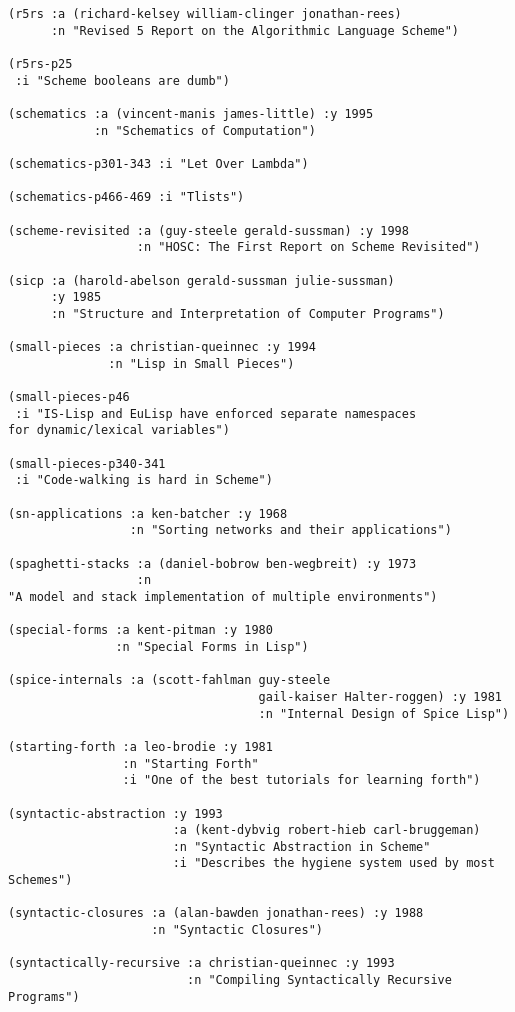 \begin{verbatim}
(r5rs :a (richard-kelsey william-clinger jonathan-rees)
      :n "Revised 5 Report on the Algorithmic Language Scheme")

(r5rs-p25
 :i "Scheme booleans are dumb")

(schematics :a (vincent-manis james-little) :y 1995
            :n "Schematics of Computation")

(schematics-p301-343 :i "Let Over Lambda")

(schematics-p466-469 :i "Tlists")

(scheme-revisited :a (guy-steele gerald-sussman) :y 1998
                  :n "HOSC: The First Report on Scheme Revisited")

(sicp :a (harold-abelson gerald-sussman julie-sussman)
      :y 1985
      :n "Structure and Interpretation of Computer Programs")

(small-pieces :a christian-queinnec :y 1994
              :n "Lisp in Small Pieces")

(small-pieces-p46
 :i "IS-Lisp and EuLisp have enforced separate namespaces
for dynamic/lexical variables")

(small-pieces-p340-341
 :i "Code-walking is hard in Scheme")

(sn-applications :a ken-batcher :y 1968
                 :n "Sorting networks and their applications")

(spaghetti-stacks :a (daniel-bobrow ben-wegbreit) :y 1973
                  :n
"A model and stack implementation of multiple environments")

(special-forms :a kent-pitman :y 1980
               :n "Special Forms in Lisp")

(spice-internals :a (scott-fahlman guy-steele
                                   gail-kaiser Halter-roggen) :y 1981
                                   :n "Internal Design of Spice Lisp")

(starting-forth :a leo-brodie :y 1981
                :n "Starting Forth"
                :i "One of the best tutorials for learning forth")

(syntactic-abstraction :y 1993
                       :a (kent-dybvig robert-hieb carl-bruggeman)
                       :n "Syntactic Abstraction in Scheme"
                       :i "Describes the hygiene system used by most Schemes")

(syntactic-closures :a (alan-bawden jonathan-rees) :y 1988
                    :n "Syntactic Closures")

(syntactically-recursive :a christian-queinnec :y 1993
                         :n "Compiling Syntactically Recursive Programs")


\end{verbatim}
